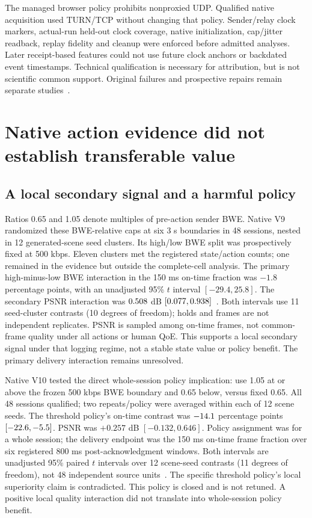 \documentclass[10pt]{article}
\begin{document}
The managed browser policy prohibits nonproxied UDP. Qualified native acquisition
used TURN/TCP without changing that policy. Sender/relay clock markers,
actual-run held-out clock coverage, native initialization, cap/jitter readback,
replay fidelity and cleanup were enforced before admitted analyses. Later
receipt-based features could not use future clock anchors or backdated event
timestamps. Technical qualification is necessary for attribution, but is not
scientific common support. Original failures and prospective repairs remain
separate studies~\cite{v9,v10,m5,m6r,m11r}.

\section{Native action evidence did not establish transferable value}
\subsection{A local secondary signal and a harmful policy}
Ratios 0.65 and 1.05 denote multiples of pre-action sender BWE.
Native V9 randomized these BWE-relative caps at six 3 s boundaries in 48
sessions, nested in 12 generated-scene seed clusters. Its high/low BWE split
was prospectively fixed at 500 kbps. Eleven clusters met the
registered state/action counts; one remained in the evidence but outside the
complete-cell analysis. The primary high-minus-low BWE interaction in the 150 ms
on-time fraction was $-1.8$ percentage points, with an unadjusted 95\% $t$ interval
$[-29.4,25.8]$. The secondary PSNR interaction was
$0.508{}$ dB $[0.077{},0.938{}]$~\cite{v9}.
Both intervals use 11 seed-cluster contrasts (10 degrees of freedom); holds
and frames are not independent replicates. PSNR is sampled among on-time frames,
not common-frame quality under all actions or human QoE. This supports a local
secondary signal under that logging regime, not a stable state value or policy
benefit. The primary delivery interaction remains unresolved.

Native V10 tested the direct whole-session policy implication: use 1.05 at or
above the frozen 500 kbps BWE boundary and 0.65 below, versus fixed 0.65.
All 48 sessions qualified; two repeats/policy were averaged within each of
12 scene seeds. The threshold policy's on-time contrast was $-14.1{}$
percentage points $[-22.6{},-5.5{}]$. PSNR was $+0.257$ dB
$[-0.132,0.646]$. Policy assignment was for a whole session; the delivery
endpoint was the 150 ms on-time frame fraction over six registered 800 ms
post-acknowledgment windows. Both intervals are unadjusted 95\% paired $t$
intervals over 12 scene-seed contrasts (11 degrees of freedom), not 48 independent
source units~\cite{v10}. The specific threshold policy's local superiority claim
is contradicted. This policy is closed and is not retuned. A positive local
quality interaction did not translate into whole-session policy benefit.
\end{document}
